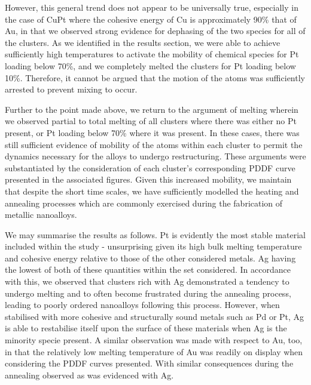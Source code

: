 However, this general trend does not appear to be universally true, especially in the case of CuPt where the cohesive energy of Cu is approximately 90\% that of Au, in that we observed strong evidence for dephasing of the two species for all of the clusters. As we identified in the results section, we were able to achieve sufficiently high temperatures to activate the mobility of chemical species for Pt loading below 70\%, and we completely melted the clusters for Pt loading below 10\%. Therefore, it cannot be argued that the motion of the atoms was sufficiently arrested to prevent mixing to occur.

Further to the point made above, we return to the argument of melting wherein we observed partial to total melting of all clusters where there was either no Pt present, or Pt loading below 70\% where it was present. In these cases, there was still sufficient evidence of mobility of the atoms within each cluster to permit the dynamics necessary for the alloys to undergo restructuring. These arguments were substantiated by the consideration of each cluster's corresponding PDDF curve presented in the associated figures. Given this increased mobility, we maintain that despite the short time scales, we have sufficiently modelled the heating and annealing processes which are commonly exercised during the fabrication of metallic nanoalloys.

We may summarise the results as follows. Pt is evidently the most stable material included within the study - unsurprising given its high bulk melting temperature and cohesive energy relative to those of the other considered metals. Ag having the lowest of both of these quantities within the set considered. In accordance with this, we observed that clusters rich with Ag demonstrated a tendency to undergo melting and to often become frustrated during the annealing process, leading to poorly ordered nanoalloys following this process. However, when stabilised with more cohesive and structurally sound metals such as Pd or Pt, Ag is able to restabilise itself upon the surface of these materials when Ag is the minority specie present. A similar observation was made with respect to Au, too, in that the relatively low melting temperature of Au was readily on display when considering the PDDF curves presented. With similar consequences during the annealing observed as was evidenced with Ag.

